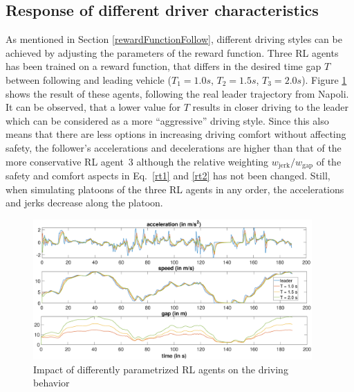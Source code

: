 \documentclass[review]{elsarticle}
\providecommand{\martinc}[1]{}                  %
\providecommand{\sub}[1]{_{\mathrm{#1}}}  %
\providecommand{\3}{{\ss}}
\begin{document}
\subsection{Response of different driver characteristics}
\label{sec:differentT}

As mentioned in Section \ref{rewardFunctionFollow}, different driving styles
can be achieved by adjusting the parameters of the reward
function. Three RL agents has been trained on a reward function, that
differs in the desired time gap $T$ between following and
leading vehicle ($T_{1} = 1.0s$, $T_{2} = 1.5s$, 
$T_{3} =2.0s$). Figure \ref{fig:differentT} shows the result of these agents,
following the real leader trajectory from Napoli. It can be observed,
that a lower value for $T$ results in closer driving to the
leader which can be considered as a more ``aggressive''
driving style. \martinc{It would be instructive to have a time series
  plot of the actual time gap $g/v$ or $(g-g_0)/v$ (restricted to
  values $<2T$). For the IDM, these
  are somewhat higher in steady state: Analytical expression 
$T_e(v):=(g_e(v)-g_0)/v=T/\sqrt{1-(v/v_0)^4}$, for the IDM+ $T_e(v)=T$
  for $v<v_0$}
Since this also means that there are less options in
increasing driving comfort without affecting safety, the follower's
accelerations and decelerations are higher than that of the more
conservative RL agent~3 although the relative
weighting $w\sub{jerk}/w\sub{gap}$ of the safety and comfort aspects in Eq.~\eqref{rt1} and \eqref{rt2} has not been
changed. Still, when simulating platoons of the three RL
  agents in any order, the accelerations and jerks decrease along the
  platoon.

\begin{figure}
	\centering
	\includegraphics[width=0.95\textwidth]{images/differentT}
	\caption{Impact of differently parametrized RL agents
          on the driving behavior }
	\label{fig:differentT}
\end{figure}
\end{document}

